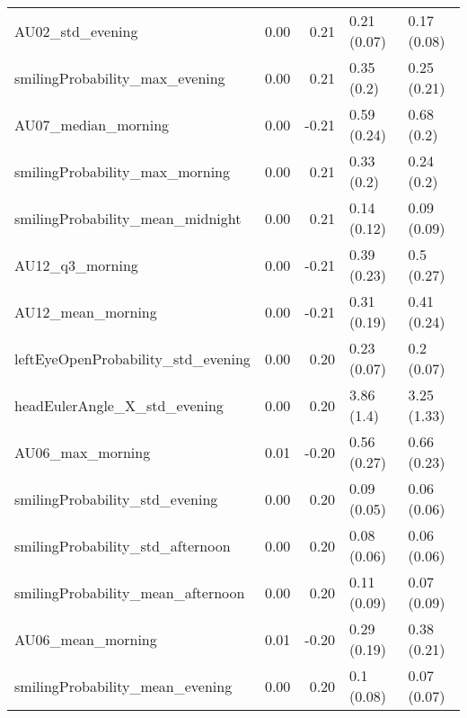 \begin{table}[h]
\begin{tabular}{lp{1cm}rp{2.5cm}p{3.1cm}}
                      AU02\_std\_evening &                   0.00 &     0.21 &                  0.21 (0.07) &                      0.17 (0.08) \\
        smilingProbability\_max\_evening &                   0.00 &     0.21 &                   0.35 (0.2) &                      0.25 (0.21) \\
                   AU07\_median\_morning &                   0.00 &    -0.21 &                  0.59 (0.24) &                       0.68 (0.2) \\
        smilingProbability\_max\_morning &                   0.00 &     0.21 &                   0.33 (0.2) &                       0.24 (0.2) \\
      smilingProbability\_mean\_midnight &                   0.00 &     0.21 &                  0.14 (0.12) &                      0.09 (0.09) \\
                       AU12\_q3\_morning &                   0.00 &    -0.21 &                  0.39 (0.23) &                       0.5 (0.27) \\
                     AU12\_mean\_morning &                   0.00 &    -0.21 &                  0.31 (0.19) &                      0.41 (0.24) \\
    leftEyeOpenProbability\_std\_evening &                   0.00 &     0.20 &                  0.23 (0.07) &                       0.2 (0.07) \\
          headEulerAngle\_X\_std\_evening &                   0.00 &     0.20 &                   3.86 (1.4) &                      3.25 (1.33) \\
                      AU06\_max\_morning &                   0.01 &    -0.20 &                  0.56 (0.27) &                      0.66 (0.23) \\
        smilingProbability\_std\_evening &                   0.00 &     0.20 &                  0.09 (0.05) &                      0.06 (0.06) \\
      smilingProbability\_std\_afternoon &                   0.00 &     0.20 &                  0.08 (0.06) &                      0.06 (0.06) \\
     smilingProbability\_mean\_afternoon &                   0.00 &     0.20 &                  0.11 (0.09) &                      0.07 (0.09) \\
                     AU06\_mean\_morning &                   0.01 &    -0.20 &                  0.29 (0.19) &                      0.38 (0.21) \\
       smilingProbability\_mean\_evening &                   0.00 &     0.20 &                   0.1 (0.08) &                      0.07 (0.07) \\
\bottomrule
\end{tabular}
\end{table}



